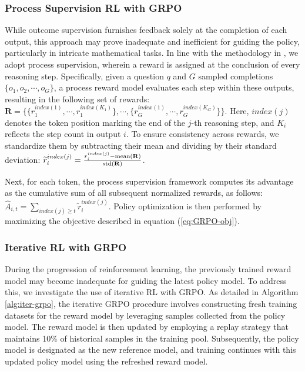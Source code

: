 \begin{itemize}[topsep=0pt]
\subsubsection{Process Supervision RL with GRPO} While outcome supervision furnishes feedback solely at the completion of each output, this approach may prove inadequate and inefficient for guiding the policy, particularly in intricate mathematical tasks. In line with the methodology in \cite{wang2023math}, we adopt process supervision, wherein a reward is assigned at the conclusion of every reasoning step. Specifically, given a question $q$ and $G$ sampled completions $\{o_1, o_2, \cdots, o_G\}$, a process reward model evaluates each step within these outputs, resulting in the following set of rewards: $\mathbf{R} = \{ \{r_1^{index(1)},\cdots,r_1^{index(K_1)}\}, \cdots,  \{r_G^{index(1)},\cdots,r_G^{index(K_G)}\} \}$. Here, $index(j)$ denotes the token position marking the end of the $j$-th reasoning step, and $K_i$ reflects the step count in output $i$. To ensure consistency across rewards, we standardize them by subtracting their mean and dividing by their standard deviation: $\widetilde{r}_i^{index(j)} = \frac{r_i^{index(j)} - {\rm mean(\mathbf{R})}}{{\rm std(\mathbf{R})}}$.

Next, for each token, the process supervision framework computes its advantage as the cumulative sum of all subsequent normalized rewards, as follows: $\hat{A}_{i, t} = \sum_{index(j) \ge t} \widetilde{r}_i^{index(j)}$.
Policy optimization is then performed by maximizing the objective described in equation (\ref{eq:GRPO-obj}).

\subsubsection{Iterative RL with GRPO} During the progression of reinforcement learning, the previously trained reward model may become inadequate for guiding the latest policy model. To address this, we investigate the use of iterative RL with GRPO. As detailed in Algorithm \ref{alg:iter-grpo}, the iterative GRPO procedure involves constructing fresh training datasets for the reward model by leveraging samples collected from the policy model. The reward model is then updated by employing a replay strategy that maintains 10\% of historical samples in the training pool. Subsequently, the policy model is designated as the new reference model, and training continues with this updated policy model using the refreshed reward model.


\end{itemize}
